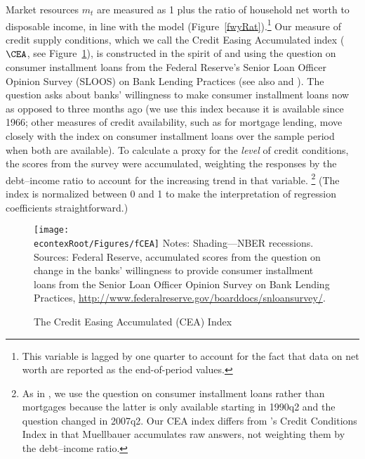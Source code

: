 \documentclass[titlepage]{\econtex}
\begin{document}
Market resources $m_t$ are measured as 1 plus the ratio of household net worth to disposable income, in line with the model (Figure~\ref{fwyRat}).\footnote{This variable is lagged by one quarter to account for the fact that data on net worth are reported as the end-of-period values.}  Our measure of credit supply conditions, which we call the Credit Easing Accumulated index ($\CEA$, see Figure~\ref{fCEA}), is constructed in the spirit of \cite{mue07} and \cite{ducaEtAl10_creditArch} using the question on consumer installment loans from the Federal Reserve's Senior Loan Officer Opinion Survey (SLOOS) on Bank Lending Practices (see also \cite{fernandezMuellbauer06} and \cite{hall:slump}).  The question asks about banks' willingness to make consumer installment loans now as opposed to three months ago (we use this index because it is available since 1966; other measures of credit availability, such as for mortgage lending, move closely with the index on consumer installment loans over the sample period when both are available). To calculate a proxy for the \emph{level} of credit conditions, the scores from the survey were accumulated, weighting the responses by the debt--income ratio to account for the increasing trend in that variable.%
\footnote{  As in \cite{mue07}, we use the question on consumer installment
  loans rather than mortgages because the latter is only available
  starting in 1990q2 and the question changed in 2007q2.
  Our CEA index differs from \cite{mue07}'s Credit Conditions Index in that Muellbauer accumulates raw answers, not weighting them by the debt--income ratio.
}
  (The index is normalized between 0 and 1 to make the interpretation of regression coefficients straightforward.)

\begin{figure}
\caption{The Credit Easing Accumulated (CEA) Index}
\label{fCEA}
\texttt{[image: \\econtexRoot/Figures/fCEA]}
\footnotesize
Notes: Shading---NBER recessions.\\[0mm]
\tiny Sources: Federal Reserve, accumulated scores from the question on change in the banks' willingness to provide consumer installment loans from the Senior Loan Officer Opinion Survey on Bank Lending Practices, \url{http://www.federalreserve.gov/boarddocs/snloansurvey/}.
\end{figure}
\end{document}
